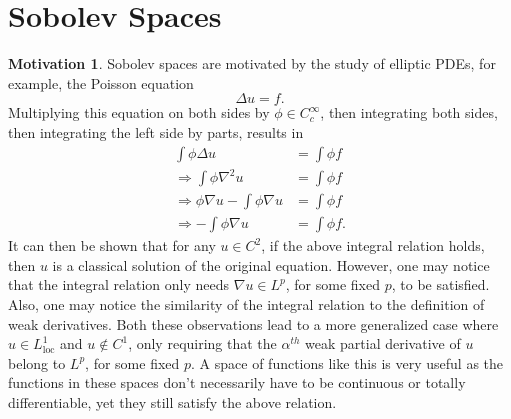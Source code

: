 \documentclass[11pt]{article}
\theoremstyle{definition}
\newtheorem*{motivation}{Motivation}
\begin{document}
\section{Sobolev Spaces}
\begin{motivation}
Sobolev spaces are motivated by the study of elliptic PDEs, for example, the Poisson equation
\[\Delta{u} = f.\]
Multiplying this equation on both sides by $\phi \in C_{c}^{\infty}$, then integrating both sides, then integrating the left side by parts, results in
\begin{equation*}
	\begin{aligned}
		\int \phi \Delta u &= \int \phi f \\
		\Rightarrow \int \phi \nabla^2 u &= \int \phi f \\
		\Rightarrow \phi \nabla u - \int \phi \nabla u &= \int \phi f \\ 
		\Rightarrow - \int \phi \nabla u &= \int \phi f.
	\end{aligned}
\end{equation*}
It can then be shown that for any $u \in C^2$, if the above integral relation holds, then $u$ is a classical solution of the original equation.
However, one may notice that the integral relation only needs $\nabla u \in L^p$, for some fixed $p$, to be satisfied.
Also, one may notice the similarity of the integral relation to the definition of weak derivatives. Both these observations lead to a more generalized
case where $u \in L^1_{\text{loc}}$ and $u \not\in C^1$, only requiring that the $\alpha^{th}$ weak partial derivative of $u$ belong to $L^p$, for some fixed $p$.
A space of functions like this is very useful as the functions in these spaces don't necessarily have to be continuous or totally differentiable,
yet they still satisfy the above relation. 
\end{motivation}
\end{document}
